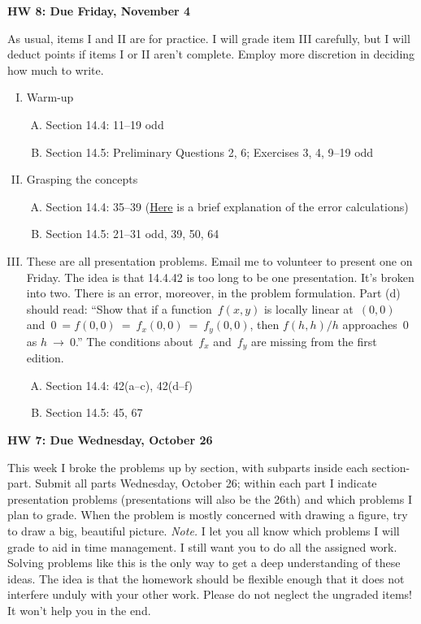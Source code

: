 \documentclass[10pt]{amsart}
\begin{document}
\begin{center}
\textbf{HW 8: Due Friday, November 4}
\end{center}
As usual, items I and II are for practice. I will grade item III carefully, but I will deduct points if items I or II aren't complete. Employ more discretion in deciding how much to write.
\begin{enumerate}[I.]
    \item Warm-up
    \begin{enumerate}[A.]
        \item Section 14.4: 11--19 odd
        \item Section 14.5: Preliminary Questions 2, 6; Exercises 3, 4, 9--19 odd
    \end{enumerate}
    \item Grasping the concepts
    \begin{enumerate}[A.]
        \item Section 14.4: 35--39 (\href{http://www.collegeofidaho.edu/academics/MathPhysics/courses/MAT-251/rosoff/error.pdf}{Here} is a brief explanation of the error calculations)
        \item Section 14.5: 21--31 odd, 39, 50, 64
    \end{enumerate}
    \item These are all presentation problems. Email me to volunteer to present one on Friday. The idea is that 14.4.42 is too long to be one presentation. It's broken into two. There is an error, moreover, in the problem formulation. Part (d) should read: ``Show that if a function~$f(x,y)$ is locally linear at~$(0,0)$ and~$0~=f(0,0)~=~f_x(0,0)~=~f_y(0,0)$, then $f(h,h)/h$ approaches~0 as $h~\to~0$.'' The conditions about~$f_x$ and~$f_y$ are missing from the first edition.
    \begin{enumerate}[A.]
        \item Section 14.4: 42(a--c), 42(d--f)
        \item Section 14.5: 45, 67
    \end{enumerate}
\end{enumerate}
\begin{center}
\textbf{HW 7: Due Wednesday, October 26}
\end{center}
This week I broke the problems up by section, with subparts inside each section-part. Submit all parts Wednesday, October 26; within each part I indicate presentation problems (presentations will also be the 26th) and which problems I plan to grade. When the problem is mostly concerned with drawing a figure, try to draw a big, beautiful picture. \emph{Note.} I let you all know which problems I will grade to aid in time management. I still want you to do all the assigned work. Solving problems like this is the only way to get a deep understanding of these ideas. The idea is that the homework should be flexible enough that it does not interfere unduly with your other work. Please do not neglect the ungraded items! It won't help you in the end.
\end{document}
